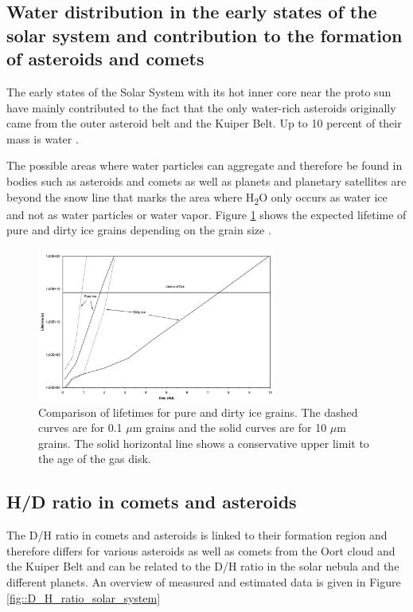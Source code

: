 \subsection{Water distribution in the early states of the solar system and contribution to the formation of asteroids and comets}

The early states of the Solar System with its hot inner core near the proto sun have mainly contributed to the fact that the only water-rich asteroids originally came from the outer asteroid belt and the Kuiper Belt. Up to 10 percent of their mass is water \cite{timescale}. 

The possible areas where water particles can aggregate and therefore be found in bodies such as asteroids and comets as well as planets and planetary satellites are beyond the snow line that marks the area where H\textsubscript{2}O only occurs as water ice and not as water particles or water vapor. Figure \ref{fig::lifetimes_ice_grains} shows the expected lifetime of pure and dirty ice grains depending on the grain size \cite{snow_line_age}.

\begin{figure}
	\centering
	\includegraphics[width=0.7\textwidth]{figures/lifetime_water_ice}
	\caption{Comparison of lifetimes for pure and dirty ice grains. The dashed curves are for 0.1 $\mu$m grains and the solid curves are for 10 $\mu$m grains. The solid horizontal line shows a conservative upper limit to the age of the gas disk.  \cite{snow_line_age}}
	\label{fig::lifetimes_ice_grains}
\end{figure}


\subsection{H/D ratio in comets and asteroids}

The D/H ratio in comets and asteroids is linked to their formation region and therefore differs for various asteroids as well as comets from the Oort cloud and the Kuiper Belt and can be related to the D/H ratio in the solar nebula and the different planets. 
An overview of measured and estimated data is given in Figure \ref{fig::D_H_ratio_solar_system}

